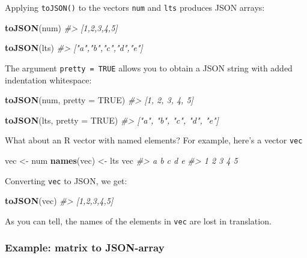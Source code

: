 \documentclass[
]{book}
\newenvironment{Shaded}{\begin{snugshade}}{\end{snugshade}}
\newcommand{\AttributeTok}[1]{\textcolor[rgb]{0.13,0.29,0.53}{#1}}
\newcommand{\CommentTok}[1]{\textcolor[rgb]{0.56,0.35,0.01}{\textit{#1}}}
\newcommand{\ConstantTok}[1]{\textcolor[rgb]{0.56,0.35,0.01}{#1}}
\newcommand{\FunctionTok}[1]{\textcolor[rgb]{0.13,0.29,0.53}{\textbf{#1}}}
\newcommand{\NormalTok}[1]{#1}
\newcommand{\OtherTok}[1]{\textcolor[rgb]{0.56,0.35,0.01}{#1}}
\begin{document}
Applying \texttt{toJSON()} to the vectors \texttt{num} and \texttt{lts} produces JSON arrays:

\begin{Shaded}
\begin{Highlighting}[]
\FunctionTok{toJSON}\NormalTok{(num)}
\CommentTok{\#\textgreater{} [1,2,3,4,5]}

\FunctionTok{toJSON}\NormalTok{(lts)}
\CommentTok{\#\textgreater{} ["a","b","c","d","e"]}
\end{Highlighting}
\end{Shaded}

The argument \texttt{pretty\ =\ TRUE} allows you to obtain a JSON string with added
indentation whitespace:

\begin{Shaded}
\begin{Highlighting}[]
\FunctionTok{toJSON}\NormalTok{(num, }\AttributeTok{pretty =} \ConstantTok{TRUE}\NormalTok{)}
\CommentTok{\#\textgreater{} [1, 2, 3, 4, 5]}

\FunctionTok{toJSON}\NormalTok{(lts, }\AttributeTok{pretty =} \ConstantTok{TRUE}\NormalTok{)}
\CommentTok{\#\textgreater{} ["a", "b", "c", "d", "e"]}
\end{Highlighting}
\end{Shaded}

What about an R vector with named elements? For example, here's a vector \texttt{vec}

\begin{Shaded}
\begin{Highlighting}[]
\NormalTok{vec }\OtherTok{\textless{}{-}}\NormalTok{ num}
\FunctionTok{names}\NormalTok{(vec) }\OtherTok{\textless{}{-}}\NormalTok{ lts}
\NormalTok{vec}
\CommentTok{\#\textgreater{} a b c d e }
\CommentTok{\#\textgreater{} 1 2 3 4 5}
\end{Highlighting}
\end{Shaded}

Converting \texttt{vec} to JSON, we get:

\begin{Shaded}
\begin{Highlighting}[]
\FunctionTok{toJSON}\NormalTok{(vec)}
\CommentTok{\#\textgreater{} [1,2,3,4,5]}
\end{Highlighting}
\end{Shaded}

As you can tell, the names of the elements in \texttt{vec} are lost in translation.

\hypertarget{example-matrix-to-json-array}{%
\subsubsection*{Example: matrix to JSON-array}\label{example-matrix-to-json-array}}
\end{document}
